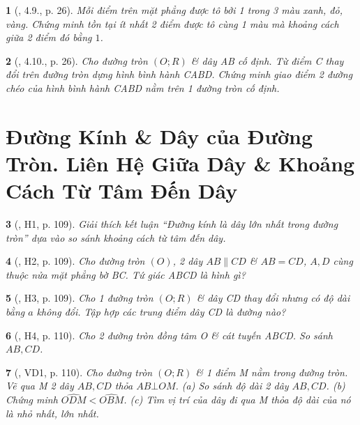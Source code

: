 \documentclass{article}
\newtheorem{baitoan}{}
\begin{document}
\begin{baitoan}[\cite{TLCT_THCS_Toan_9_hinh_hoc}, 4.9., p. 26]
	Mỗi điểm trên mặt phẳng được tô bởi 1 trong 3 màu xanh, đỏ, vàng. Chứng minh tồn tại ít nhất 2 điểm được tô cùng 1 màu mà khoảng cách giữa 2 điểm đó bằng $1$.
\end{baitoan}

\begin{baitoan}[\cite{TLCT_THCS_Toan_9_hinh_hoc}, 4.10., p. 26]
	Cho đường tròn $(O;R)$ \& dây AB cố định. Từ điểm C thay đổi trên đường tròn dựng hình bình hành CABD. Chứng minh giao điểm 2 đường chéo của hình bình hành CABD nằm trên 1 đường tròn cố định.
\end{baitoan}


\section{Đường Kính \& Dây của Đường Tròn. Liên Hệ Giữa Dây \& Khoảng Cách Từ Tâm Đến Dây}

\begin{baitoan}[\cite{Binh_boi_duong_Toan_9_tap_1}, H1, p. 109]
	Giải thích kết luận ``Đường kính là dây lớn nhất trong đường tròn'' dựa vào so sánh khoảng cách từ tâm đến dây.
\end{baitoan}

\begin{baitoan}[\cite{Binh_boi_duong_Toan_9_tap_1}, H2, p. 109]
	Cho đường tròn $(O)$, 2 dây $AB\parallel CD$ \& $AB = CD$, $A,D$ cùng thuộc nửa mặt phẳng bờ BC. Tứ giác ABCD là hình gì?
\end{baitoan}

\begin{baitoan}[\cite{Binh_boi_duong_Toan_9_tap_1}, H3, p. 109]
	Cho 1 đường tròn $(O;R)$ \& dây CD thay đổi nhưng có độ dài bằng $a$ không đổi. Tập hợp các trung điểm dây CD là đường nào?
\end{baitoan}

\begin{baitoan}[\cite{Binh_boi_duong_Toan_9_tap_1}, H4, p. 110]
	Cho 2 đường tròn đồng tâm O \& cát tuyến ABCD. So sánh $AB,CD$.
\end{baitoan}

\begin{baitoan}[\cite{Binh_boi_duong_Toan_9_tap_1}, VD1, p. 110]
	Cho đường tròn $(O;R)$ \& 1 điểm M nằm trong đường tròn. Vẽ qua M 2 dây $AB,CD$ thỏa $AB\bot OM$. (a) So sánh độ dài 2 dây $AB,CD$. (b) Chứng minh $\widehat{ODM} < \widehat{OBM}$. (c) Tìm vị trí của dây đi qua M thỏa độ dài của nó là nhỏ nhất, lớn nhất.
\end{baitoan}
\end{document}
